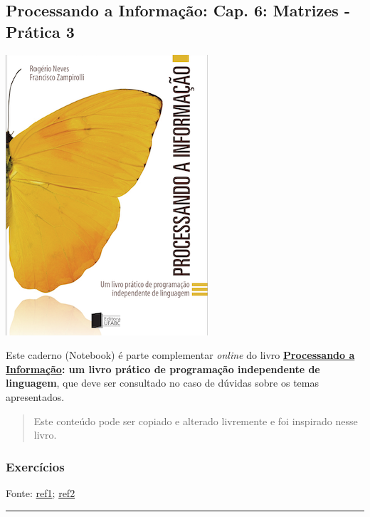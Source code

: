 \documentclass[12pt,a4paper]{article}
\begin{document}
    \hypertarget{processando-a-informauxe7uxe3o-cap.-6-matrizes---pruxe1tica-3}{%
\subsection{Processando a Informação: Cap. 6: Matrizes - Prática
3}\label{processando-a-informauxe7uxe3o-cap.-6-matrizes---pruxe1tica-3}}

    \includegraphics{"figs/Capa_Processando_Informacao.jpg"}

Este caderno (Notebook) é parte complementar \emph{online} do livro
\textbf{\href{https://editora.ufabc.edu.br/matematica-e-ciencias-da-computacao/58-processando-a-informacao}{Processando
a Informação}: um livro prático de programação independente de
linguagem}, que deve ser consultado no caso de dúvidas sobre os temas
apresentados.

\begin{quote}
Este conteúdo pode ser copiado e alterado livremente e foi inspirado
nesse livro.
\end{quote}

    \hypertarget{exercuxedcios}{%
\subsubsection{Exercícios}\label{exercuxedcios}}

Fonte:
\href{http://www.deinf.ufma.br/~csalles/prog/prog_lista2.pdf}{ref1};
\href{http://www.facom.ufu.br/~backes/wordpress/ListaC04.pdf}{ref2}

    \begin{center}\rule{0.5\linewidth}{0.5pt}\end{center}
\end{document}
